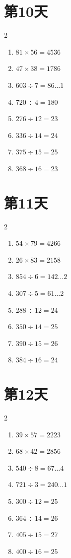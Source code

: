 \documentclass[12pt]{ctexart}
\begin{document}
	\section*{第10天}
	\begin{multicols}{2}
		\begin{enumerate}[itemsep=0pt]
			\item $81 \times 56 = 4536$
			\item $47 \times 38 = 1786$
			\item $603 \div 7 = 86\ldots 1$
			\item $720 \div 4 = 180$
			\item $276 \div 12 = 23$
			\item $336 \div 14 = 24$
			\item $375 \div 15 = 25$
			\item $368 \div 16 = 23$
		\end{enumerate}
	\end{multicols}
	
	\section*{第11天}
	\begin{multicols}{2}
		\begin{enumerate}[itemsep=0pt]
			\item $54 \times 79 = 4266$
			\item $26 \times 83 = 2158$
			\item $854 \div 6 = 142\ldots 2$
			\item $307 \div 5 = 61\ldots 2$
			\item $288 \div 12 = 24$
			\item $350 \div 14 = 25$
			\item $390 \div 15 = 26$
			\item $384 \div 16 = 24$
		\end{enumerate}
	\end{multicols}
	
	\section*{第12天}
	\begin{multicols}{2}
		\begin{enumerate}[itemsep=0pt]
			\item $39 \times 57 = 2223$
			\item $68 \times 42 = 2856$
			\item $540 \div 8 = 67\ldots 4$
			\item $721 \div 3 = 240\ldots 1$
			\item $300 \div 12 = 25$
			\item $364 \div 14 = 26$
			\item $405 \div 15 = 27$
			\item $400 \div 16 = 25$
		\end{enumerate}
	\end{multicols}
	
\end{document}
